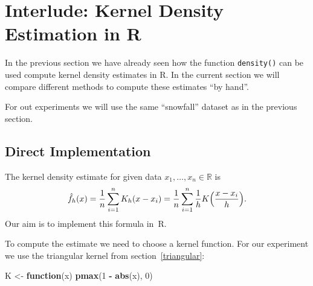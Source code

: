 \documentclass[
  a4paper,
]{article}
\newenvironment{Shaded}{\begin{snugshade}}{\end{snugshade}}
\newcommand{\CommentTok}[1]{\textcolor[rgb]{0.56,0.35,0.01}{\textit{#1}}}
\newcommand{\ControlFlowTok}[1]{\textcolor[rgb]{0.13,0.29,0.53}{\textbf{#1}}}
\newcommand{\DecValTok}[1]{\textcolor[rgb]{0.00,0.00,0.81}{#1}}
\newcommand{\FunctionTok}[1]{\textcolor[rgb]{0.13,0.29,0.53}{\textbf{#1}}}
\newcommand{\NormalTok}[1]{#1}
\newcommand{\OtherTok}[1]{\textcolor[rgb]{0.56,0.35,0.01}{#1}}
\newcommand{\SpecialCharTok}[1]{\textcolor[rgb]{0.81,0.36,0.00}{\textbf{#1}}}
\newcommand{\StringTok}[1]{\textcolor[rgb]{0.31,0.60,0.02}{#1}}
\theoremstyle{definition}
\theoremstyle{definition}
\theoremstyle{definition}
\theoremstyle{definition}
\theoremstyle{remark}
\begin{document}
\clearpage

\section*{Interlude: Kernel Density Estimation in R}\label{I01-KDE}

In the previous section we have already seen how the function \texttt{density()}
can be used compute kernel density estimates in R. In the current section
we will compare different methods to compute these estimates ``by hand''.

For out experiments we will use the same ``snowfall'' dataset as in the
previous section.

\begin{Shaded}
\end{Shaded}

\subsection*{Direct Implementation}\label{direct-implementation}

The kernel density estimate for given data \(x_1, \ldots, x_n \in\mathbb{R}\)
is
\begin{equation*}
  \hat f_h(x)
  = \frac{1}{n} \sum_{i=1}^n K_h(x - x_i)
  = \frac{1}{n} \sum_{i=1}^n \frac{1}{h} K\Bigl( \frac{x - x_i}{h} \Bigr).
\end{equation*}
Our aim is to implement this formula in~R.

To compute the estimate we need to choose a kernel function.
For our experiment we use the triangular kernel from section~\ref{triangular}:

\begin{Shaded}
\begin{Highlighting}[]
\NormalTok{K }\OtherTok{\textless{}{-}} \ControlFlowTok{function}\NormalTok{(x) }\FunctionTok{pmax}\NormalTok{(}\DecValTok{1} \SpecialCharTok{{-}} \FunctionTok{abs}\NormalTok{(x), }\DecValTok{0}\NormalTok{)}
\end{Highlighting}
\end{Shaded}
\end{document}
